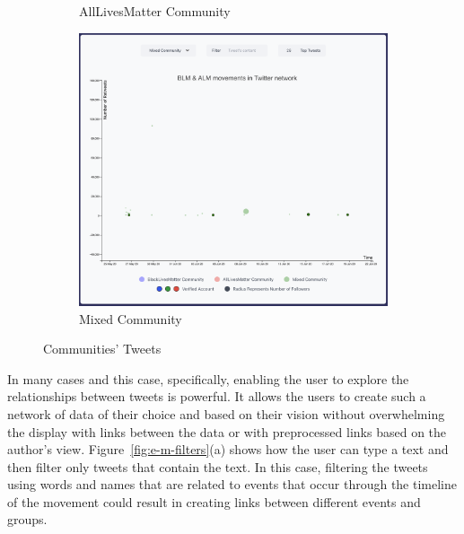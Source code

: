 \begin{figure}[H]
\begin{subfigure}{.5\textwidth}
  \caption{AllLivesMatter Community}
  \label{fig:sub-second}
\end{subfigure}
\begin{subfigure}{.5\textwidth}
  \centering
  \captionsetup{justification=centering}
  \includegraphics[width=1\linewidth]{Report-latex/tex_files/pics/example/emixed.png}  
  \caption{Mixed Community}
  \label{fig:sub-second}
\end{subfigure}

\captionsetup{justification=centering}
\caption{Communities' Tweets }
\label{fig:e-coms}
\end{figure}

\newpage




In many cases and this case, specifically, enabling the user to explore the relationships between tweets is powerful. It allows the users to create such a network of data of their choice and based on their vision without overwhelming the display with links between the data or with preprocessed links based on the author's view. 
Figure~\ref{fig:e-m-filters}(a) shows how the user can type a text and then filter only tweets that contain the text. In this case, filtering the tweets using words and names that are related to events that occur through the timeline of the movement could result in creating links between different events and groups. 

